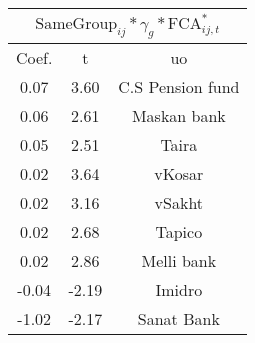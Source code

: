     \begin{tabular}{ccc}
    \hline\hline
    \multicolumn{3}{c}{$\text{SameGroup}_{ij} * \gamma_g  * \text{FCA}_{ij,t}^*$} \\
    \hline
    Coef. & t     & uo \\
    \hline
    0.07  & 3.60  & {C.S Pension fund} \\
    0.06  & 2.61  & Maskan bank \\
    0.05  & 2.51  & Taira \\
    0.02  & 3.64  & vKosar \\
    0.02  & 3.16  & vSakht \\
    0.02  & 2.68  & Tapico \\
    0.02  & 2.86  & Melli bank \\
    -0.04 & -2.19 & Imidro \\
    -1.02 & -2.17 & Sanat Bank \\
    \hline\hline
    \end{tabular}%